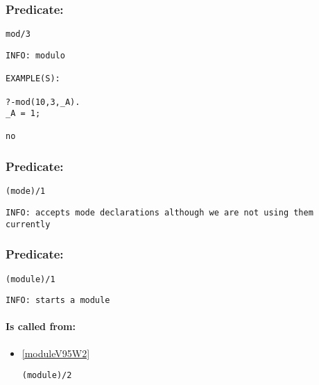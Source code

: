 \subsubsection{Predicate:} \label{modV95W3}

\begin{verbatim}
mod/3
\end{verbatim}

{\small \begin{verbatim}
INFO: modulo

EXAMPLE(S):

?-mod(10,3,_A).
_A = 1;

no

\end{verbatim}}

\subsubsection{Predicate:} \label{modeV95W1}

\begin{verbatim}
(mode)/1
\end{verbatim}

{\small \begin{verbatim}
INFO: accepts mode declarations although we are not using them currently

\end{verbatim}}

\subsubsection{Predicate:} \label{moduleV95W1}

\begin{verbatim}
(module)/1
\end{verbatim}

{\small \begin{verbatim}
INFO: starts a module

\end{verbatim}}
\paragraph{Is called from:} 
\begin{itemize}
\item \ref{moduleV95W2} 
\begin{verbatim}
(module)/2
\end{verbatim}

\end{itemize}

